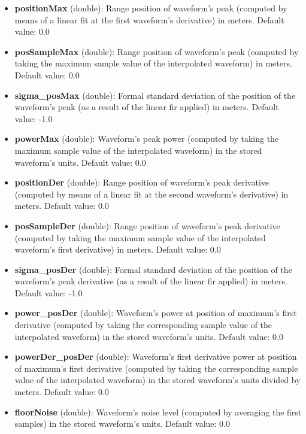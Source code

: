 \begin{itemize}
\item {\bf positionMax} (double): Range position of waveform's peak (computed by means of a linear fit at the first waveform's derivative) in meters. Default value: 0.0

\item {\bf posSampleMax} (double): Range position of waveform's peak (computed by taking the maximum sample value of the interpolated waveform) in meters. Default value: 0.0

\item {\bf sigma\_posMax} (double): Formal standard deviation of the position of the waveform's peak (as a result of the linear fir applied) in meters. Default value: -1.0

\item {\bf powerMax} (double): Waveform's peak power (computed by taking the maximum sample value of the interpolated waveform) in the stored waveform's units. Default value: 0.0

\item {\bf positionDer} (double): Range position of waveform's peak derivative (computed by means of a linear fit at the second waveform's derivative) in meters. Default value: 0.0

\item {\bf posSampleDer} (double): Range position of waveform's peak derivative (computed by taking the maximum sample value of the interpolated waveform's first derivative) in meters. Default value: 0.0

\item {\bf sigma\_posDer} (double): Formal standard deviation of the position of the waveform's peak derivative (as a result of the linear fir applied) in meters. Default value: -1.0

\item {\bf power\_posDer} (double): Waveform's power at position of maximum's first derivative (computed by taking the corresponding sample value of the interpolated waveform) in the stored waveform's units. Default value: 0.0

\item {\bf powerDer\_posDer} (double): Waveform's first derivative power at position of maximum's first derivative (computed by taking the corresponding sample value of the interpolated waveform) in the stored waveform's units divided by meters. Default value: 0.0

\item {\bf floorNoise} (double): Waveform's noise level (computed by averaging the first samples) in the stored waveform's units. Default value: 0.0


\end{itemize}
